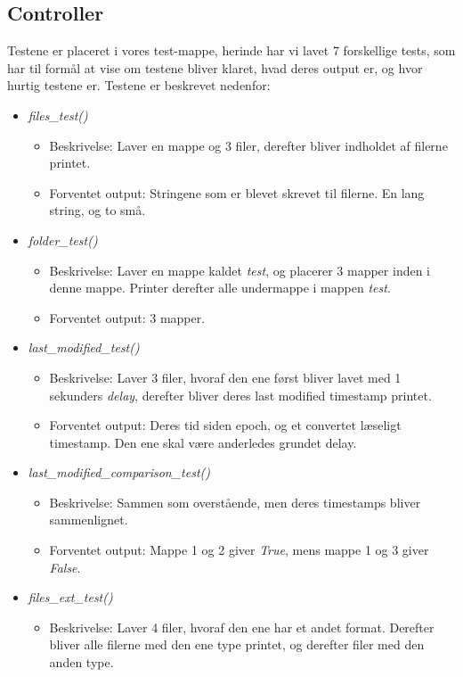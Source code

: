 \documentclass[11pt]{article}
\begin{document}
\subsection{Controller}
Testene er placeret i vores test-mappe, herinde har vi lavet 7 forskellige tests, som har til formål at vise om testene bliver klaret, hvad deres output er, og hvor hurtig testene er. Testene er beskrevet nedenfor: \\
\begin{itemize}
\item \textit{files\_test()}
  \begin{itemize}
  \item Beskrivelse: Laver en mappe og 3 filer, derefter bliver indholdet af filerne printet.
  \item Forventet output: Stringene som er blevet skrevet til filerne. En lang string, og to små.
  \end{itemize}
\item \textit{folder\_test()}
  \begin{itemize}
  \item Beskrivelse: Laver en mappe kaldet \textit{test}, og placerer 3 mapper inden i denne mappe. Printer derefter alle undermappe i mappen \textit{test}.
  \item Forventet output: 3 mapper.
  \end{itemize}
\item \textit{last\_modified\_test()}
  \begin{itemize}
  \item Beskrivelse: Laver 3 filer, hvoraf den ene først bliver lavet med 1 sekunders \textit{delay}, derefter bliver deres last modified timestamp printet.
  \item Forventet output: Deres tid siden epoch, og et convertet læseligt timestamp. Den ene skal være anderledes grundet delay.
  \end{itemize}
\item \textit{last\_modified\_comparison\_test()}
  \begin{itemize}
  \item Beskrivelse: Sammen som overstående, men deres timestamps bliver sammenlignet.
  \item Forventet output: Mappe 1 og 2 giver \textit{True}, mens mappe 1 og 3 giver \textit{False}.
  \end{itemize}
\item \textit{files\_ext\_test()}
  \begin{itemize}
  \item Beskrivelse: Laver 4 filer, hvoraf den ene har et andet format. Derefter bliver alle filerne med den ene type printet, og derefter filer med den anden type.

\end{itemize}
\end{itemize}
\end{document}
